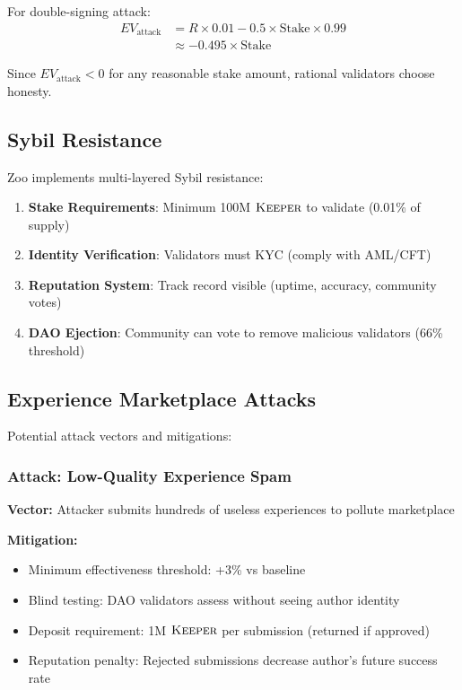 For double-signing attack:
\begin{align}
EV_{\text{attack}} &= R \times 0.01 - 0.5 \times \text{Stake} \times 0.99 \\
&\approx -0.495 \times \text{Stake}
\end{align}

Since $EV_{\text{attack}} < 0$ for any reasonable stake amount, rational validators choose honesty.

\subsection{Sybil Resistance}

Zoo implements multi-layered Sybil resistance:

\begin{enumerate}
\item \textbf{Stake Requirements}: Minimum 100M $\textsc{Keeper}$ to validate (0.01\% of supply)
\item \textbf{Identity Verification}: Validators must KYC (comply with AML/CFT)
\item \textbf{Reputation System}: Track record visible (uptime, accuracy, community votes)
\item \textbf{DAO Ejection}: Community can vote to remove malicious validators (66\% threshold)
\end{enumerate}

\subsection{Experience Marketplace Attacks}

Potential attack vectors and mitigations:

\subsubsection{Attack: Low-Quality Experience Spam}

\textbf{Vector:} Attacker submits hundreds of useless experiences to pollute marketplace

\textbf{Mitigation:}
\begin{itemize}
\item Minimum effectiveness threshold: +3\% vs baseline
\item Blind testing: DAO validators assess without seeing author identity
\item Deposit requirement: 1M $\textsc{Keeper}$ per submission (returned if approved)
\item Reputation penalty: Rejected submissions decrease author's future success rate
\end{itemize}

